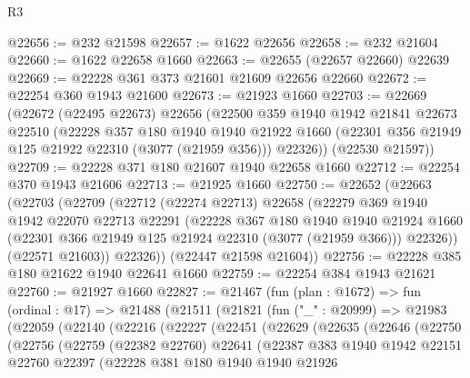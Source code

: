\begin{lexlean}{R3}
\begin{coremodule}
@22656 := @232 @21598
@22657 := @1622 @22656
@22658 := @232 @21604
@22660 := @1622 @22658 @1660
@22663 := @22655 (@22657 @22660) @22639
@22669 := @22228 @361 @373 @21601 @21609 @22656 @22660
@22672 := @22254 @360 @1943 @21600
@22673 := @21923 @1660
@22703 := @22669
    (@22672
      (@22495 @22673)
      @22656
      (@22500
        @359
        @1940
        @1942
        @21841
        @22673
        @22510
        (@22228
          @357
          @180
          @1940
          @1940
          @21922
          @1660
          (@22301 @356 @21949 @125 @21922 @22310 (@3077 (@21959 @356)))
          @22326))
      (@22530 @21597))
@22709 := @22228 @371 @180 @21607 @1940 @22658 @1660
@22712 := @22254 @370 @1943 @21606
@22713 := @21925 @1660
@22750 := @22652
    (@22663
      (@22703
        (@22709
          (@22712
            (@22274 @22713)
            @22658
            (@22279
              @369
              @1940
              @1942
              @22070
              @22713
              @22291
              (@22228
                @367
                @180
                @1940
                @1940
                @21924
                @1660
                (@22301 @366 @21949 @125 @21924 @22310 (@3077 (@21959 @366)))
                @22326))
            (@22571 @21603))
          @22326))
      (@22447 @21598 @21604))
@22756 := @22228 @385 @180 @21622 @1940 @22641 @1660
@22759 := @22254 @384 @1943 @21621
@22760 := @21927 @1660
@22827 := @21467
    (fun (plan : @1672) =>
    fun (ordinal : @17) =>
    @21488
      (@21511
        (@21821
          (fun ("_" : @20999) =>
          @21983
            (@22059
              (@22140
                (@22216
                  (@22227
                    (@22451
                      (@22629
                        (@22635
                          (@22646
                            (@22750
                              (@22756
                                (@22759
                                  (@22382 @22760)
                                  @22641
                                  (@22387
                                    @383
                                    @1940
                                    @1942
                                    @22151
                                    @22760
                                    @22397
                                    (@22228
                                      @381
                                      @180
                                      @1940
                                      @1940
                                      @21926

\end{coremodule}
\end{lexlean}
